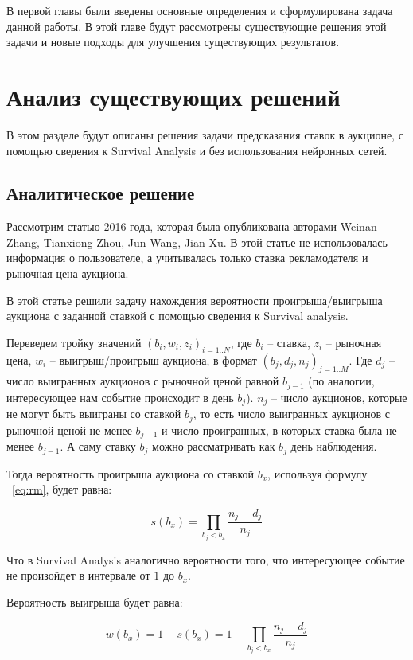 \documentclass[times,specification,annotation]{itmo-student-thesis}
\begin{document}
В первой главы были введены основные определения и сформулирована задача данной работы. 
В этой главе будут рассмотрены существующие решения этой задачи и новые подходы для улучшения существующих результатов.

\section{Анализ существующих решений}

В этом разделе будут описаны решения задачи предсказания ставок в аукционе, 
с помощью сведения к Survival Analysis и без использования нейронных сетей.

\subsection{Аналитическое решение}

Рассмотрим статью 2016 года, которая была опубликована авторами Weinan Zhang, Tianxiong Zhou, Jun Wang, Jian Xu. 
В этой статье не использовалась информация о пользователе, а учитывалась только ставка рекламодателя и рыночная цена аукциона.

В этой статье решили задачу нахождения вероятности проигрыша/выигрыша аукциона с заданной ставкой с помощью сведения к Survival analysis.

Переведем тройку значений $(b_i, w_i, z_i )_{i=1..N}$, где $b_i$ – ставка, $z_i$ – рыночная цена, $w_i$ – выигрыш/проигрыш аукциона, 
в формат $(b_j,d_j,n_j )_{j=1..M}$. Где $d_j$ – число выигранных аукционов с рыночной ценой равной 
$b_{j-1}$ (по аналогии, интересующее нам событие происходит в день $b_j$). 
$n_j$ – число аукционов, которые не могут быть выиграны со ставкой $b_j$, 
то есть число выигранных аукционов с рыночной ценой не менее $b_{j-1}$ и число проигранных, 
в которых ставка была не менее $b_{j-1}$. А саму ставку $b_j$ можно рассматривать как $b_j$ день наблюдения.

Тогда вероятность проигрыша аукциона со ставкой $b_x$, используя формулу ~\ref{eq:rm}, будет равна:

\begin{equation}
    s(b_x) = \prod_{b_j < b_x} \frac{n_j - d_j}{n_j}
\end{equation}

Что в Survival Analysis аналогично вероятности того, что интересующее событие не произойдет в интервале от $1$ до $b_x$.

Вероятность выигрыша будет равна:

\begin{equation}
    w(b_x) = 1 - s(b_x) = 1 - \prod_{b_j < b_x} \frac{n_j - d_j}{n_j}
\end{equation}
\end{document}
